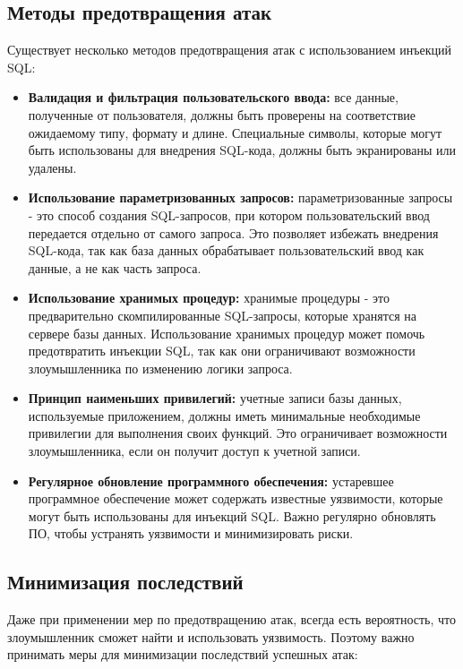 \documentclass[a4paper,12pt]{diplom}
\begin{document}
	 \subsection{Методы предотвращения атак}
	 
	 Существует несколько методов предотвращения атак с использованием инъекций SQL:
	 
	 \begin{itemize}
	 	\item \textbf{Валидация и фильтрация пользовательского ввода:} все данные, полученные от пользователя, должны быть проверены на соответствие ожидаемому типу, формату и длине.  Специальные символы, которые могут быть использованы для внедрения SQL-кода,  должны быть экранированы или удалены. 
	 	\item \textbf{Использование параметризованных запросов:} параметризованные запросы - это способ создания SQL-запросов, при котором пользовательский ввод передается отдельно от самого запроса.  Это позволяет избежать внедрения SQL-кода, так как база данных обрабатывает пользовательский ввод как данные, а не как часть запроса. 
	 	\item \textbf{Использование хранимых процедур:} хранимые процедуры - это предварительно скомпилированные SQL-запросы, которые хранятся на сервере базы данных.  Использование хранимых процедур может помочь предотвратить инъекции SQL, так как они ограничивают возможности злоумышленника по изменению логики запроса. 
	 	\item \textbf{Принцип наименьших привилегий:} учетные записи базы данных, используемые приложением, должны иметь минимальные необходимые привилегии для выполнения своих функций.  Это ограничивает возможности злоумышленника, если он получит доступ к учетной записи. 
	 	\item \textbf{Регулярное обновление программного обеспечения:} устаревшее программное обеспечение может содержать известные уязвимости, которые могут быть использованы для инъекций SQL.  Важно регулярно обновлять ПО, чтобы устранять уязвимости и минимизировать риски. 
	 \end{itemize}
	 
	 \subsection{Минимизация последствий}
	 
	 Даже при применении мер по предотвращению атак, всегда есть вероятность, что злоумышленник сможет найти и использовать уязвимость.  Поэтому важно принимать меры для минимизации последствий успешных атак:
	 
\end{document}
